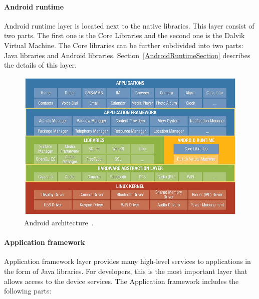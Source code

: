 \paragraph{Android runtime}
Android runtime layer is located next to the native libraries. This layer consist of two parts. The first one is the
Core Libraries and the second one is the Dalvik Virtual Machine. The Core libraries can be further subdivided into two
parts: Java libraries and Android libraries. Section~\ref{AndroidRuntimeSection} describes the details of this layer.
\\
\begin{figure}[h!]
    \centering
    \includegraphics[scale=0.54]{fig/android_architecture.jpg}
    \caption{Android architecture~\cite{AndroidArch}.}
    \label{AndroidArchitectureFigure}
\end{figure}

\paragraph{Application framework}
Application framework layer provides many high-level services to applications in the form of Java libraries. For
developers, this is the most important layer that allows access to the device services. The Application framework
includes the following parts:
 
